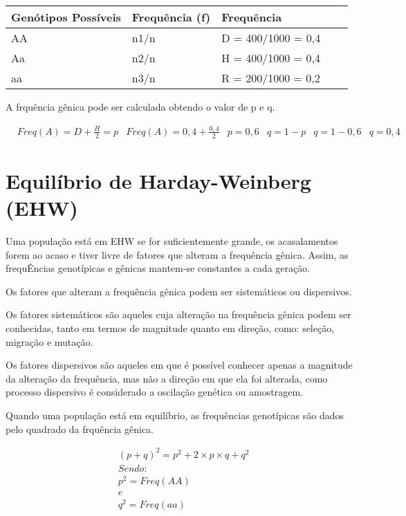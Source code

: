 \begin{table}[H]
\centering
\begin{tabular}{l l l l l}
\toprule
 \textbf{Genótipos Possíveis} & \textbf{Frequência (f)} & \textbf{Frequência}  \\
\midrule
 AA &  n1/n & D = 400/1000 = 0,4 \\
 Aa &  n2/n & H = 400/1000 = 0,4 \\
 aa &  n3/n & R = 200/1000 = 0,2 \\
\bottomrule
\end{tabular}
\end{table}


A frquência gênica pode ser calculada obtendo o valor de p e q.

\begin{align}
& Freq(A) = D   + \frac{H}{2} = p
& Freq(A) = 0,4 + \frac{0,4}{2}
& p = 0,6
& q = 1 - p
& q = 1 - 0,6
& q = 0,4
\end{align}


\section{Equilíbrio de Harday-Weinberg (EHW)}

Uma população está em EHW se for suficientemente grande, os acasalamentos forem ao acaso e tiver livre de fatores que alteram a frequência gênica. Assim, as frequÊncias genotípicas e gênicas mantem-se constantes a cada geração.

Os fatores que alteram a frequência gênica podem ser sistemáticos ou dispersivos. 

Os fatores sistemáticos  são aqueles cuja alteração na frequência gênica podem ser conhecidas, tanto em termos de magnitude quanto em direção, como: seleção, migração e mutação. 

Os fatores dispersivos  são aqueles em que é possível conhecer apenas a magnitude da alteração da frequência, mas não a direção em que ela foi alterada, como processo dispersivo é considerado a oscilação genética ou amostragem. 

Quando uma população está em equilíbrio, as frequências genotípicas são dados pelo quadrado da frquência gênica.

\begin{definition}
\begin{align}
& (p+q)^2 = p^2 + 2 \times p \times q + q^2 \\
& Sendo: \\
& p^2 = Freq(AA)  \\
& e  \\
& q^2 = Freq(aa) \\
\end{align}
\end{definition}


